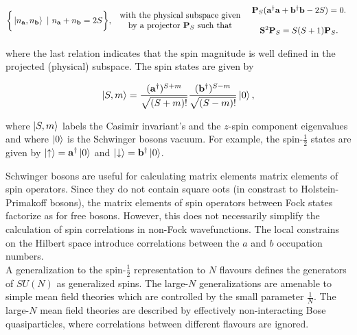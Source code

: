 \documentclass{homework}
\begin{document}
\begin{equation}
    \begin{split}
         \bigg\{\ket{n_{\bf a}, n_{\bf b}} \textnormal{ } | \textnormal{ } n_{\bf a} + n_{\bf b} = 2S\bigg\}, \begin{array}{c}
            \textnormal{ with the physical   subspace given }  \\
            \textnormal{ by a projector ${\bf P}_S$  such that } \\         \end{array} \begin{array}{c}
              {\bf P}_{S}({\bf a}^\dagger {\bf a} + {\bf b}^\dagger {\bf b} - 2S) = 0. \\ 
              \\
              {\bf S}^2 {\bf P}_S = S(S+1) {\bf P}_S.
         \end{array}
     \label{Schwinger_boson_projector}
    \end{split}
\end{equation}

where the last relation indicates that the spin magnitude is well defined in the projected (physical) subspace. The spin states are given by 

\begin{equation}
    \ket{S, m} = \frac{({\bf a}^\dagger)^{S+m}}{\sqrt{(S+m)!}} \frac{({\bf b}^\dagger)^{S-m}}{\sqrt{(S-m)!}} \ket{0}, 
\end{equation}

where $\ket{S,m}$ labels the Casimir invariant's and the $z$-spin component eigenvalues and where $\ket{0}$ is the Schwinger bosons vacuum. For example, the spin-$\frac{1}{2}$ states are given by $\ket{\uparrow} = {\bf a}^\dagger \ket{0}$ and $\ket{\downarrow} = {\bf b}^\dagger \ket{0}$. 

\begin{tcolorbox}[colback=my-blue, title = Physical Context]

Schwinger bosons are useful for calculating matrix elements matrix elements of spin operators. Since they do not contain square oots (in constrast to Holstein-Primakoff bosons), the matrix elements of spin operators between Fock states factorize as for free bosons. However, this does not necessarily simplify the calculation of spin correlations in non-Fock wavefunctions. The local constrains on the Hilbert space introduce correlations between the $a$ and $b$ occupation numbers. \\

A generalization to the spin-$\frac{1}{2}$ representation to $N$ flavours defines the generators of $SU(N)$ as generalized spins. The large-$N$ generalizations are amenable to simple mean field theories which are controlled by the small parameter $\frac{1}{N}$. The large-$N$ mean field theories are described by effectively non-interacting Bose quasiparticles, where correlations between different flavours are ignored.

\end{tcolorbox}
\end{document}
